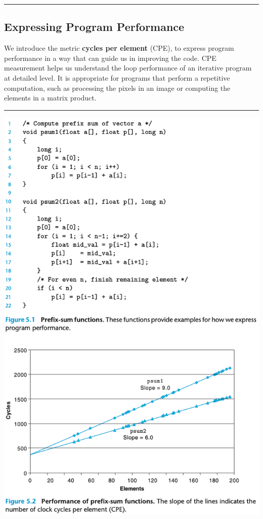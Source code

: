 \documentclass[11pt]{article}
\begin{document}
\noindent\rule{\textwidth}{0.5pt}


\subsection{Expressing Program Performance}
\label{sec:orgfa2643d}
We introduce the metric \textbf{cycles per element} (CPE), to express program performance in a way that can guide us in improving the code. CPE measurement helps us understand the loop performance of an iterative program at detailed level. It is appropriate for programs that perform a repetitive computation, such as processing the pixels in an image or computing the elements in a matrix product.\\

\noindent\rule{\textwidth}{0.5pt}

\begin{center}
\includegraphics[width=.9\linewidth]{pics/figure5.2-performance-of-prefix-sum-functions.png}
\end{center}
\end{document}
